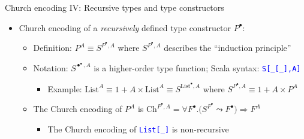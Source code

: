 \documentclass[english,,russian]{beamer}
\begin{document}
\begin{frame}{Church encoding IV: Recursive types and type constructors}
\begin{itemize}
\begin{itemize}
\end{itemize}
\item Church encoding of a \emph{recursively} defined type constructor $P^{\bullet}$:
\begin{itemize}
\item Definition: $P^{A}\equiv S^{P^{\bullet},A}$ where $S^{P^{\bullet},A}$
describes the ``induction principle''
\item Notation: {\footnotesize{}$S^{\bullet^{\bullet},A}$} is a higher-order
type function; Scala syntax: \texttt{\textcolor{blue}{\footnotesize{}S{[}\_{[}\_{]},A{]}}} 
\begin{itemize}
\item {\footnotesize{}\vspace{-0.3cm}}Example: $\text{List}^{A}\equiv1+A\times\text{List}^{A}\equiv S^{\text{List}^{\bullet},A}$
where $S^{P^{\bullet},A}\equiv1+A\times P^{A}$ 
\end{itemize}
\item The Church encoding of $P^{A}$ is {\footnotesize{}$\text{Ch}^{P^{\bullet},A}=\forall F^{\bullet}.\big(S^{F^{\bullet}}\leadsto F^{\bullet}\big)\Rightarrow F^{A}$}{\footnotesize\par}
\begin{itemize}
\item The Church encoding of \texttt{\textcolor{blue}{\footnotesize{}List{[}\_{]}}}
is non-recursive
\end{itemize}
\end{itemize}
\end{itemize}
\end{frame}
\end{document}
